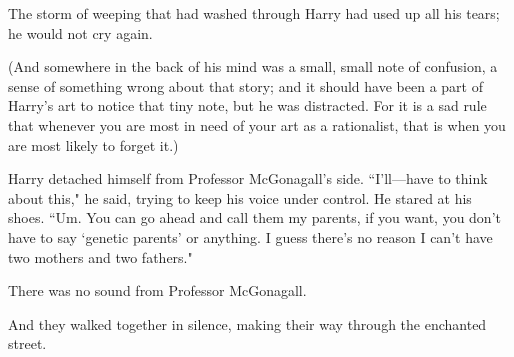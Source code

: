The storm of weeping that had washed through Harry had used up all his tears; he would not cry again.

(And somewhere in the back of his mind was a small, small note of confusion, a sense of something wrong about that story; and it should have been a part of Harry's art to notice that tiny note, but he was distracted. For it is a sad rule that whenever you are most in need of your art as a rationalist, that is when you are most likely to forget it.)

Harry detached himself from Professor McGonagall's side. ``I'll—have to think about this," he said, trying to keep his voice under control. He stared at his shoes. ``Um. You can go ahead and call them my parents, if you want, you don't have to say `genetic parents' or anything. I guess there's no reason I can't have two mothers and two fathers."

There was no sound from Professor McGonagall.

And they walked together in silence, making their way through the enchanted street.

